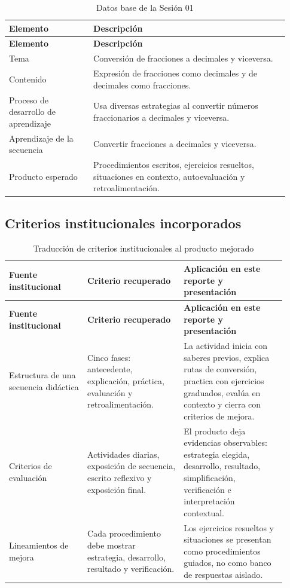 \documentclass[
	spanish,
	letterpaper, oneside
]{article}
\begin{document}
\begin{longtable}{@{}p{0.28\linewidth}p{0.65\linewidth}@{}}
	\caption{Datos base de la Sesión 01}\label{tab:datos-sesion}\\
	\toprule
	\textbf{Elemento} & \textbf{Descripción} \\
	\midrule
	\endfirsthead
	\toprule
	\textbf{Elemento} & \textbf{Descripción} \\
	\midrule
	\endhead
	Tema & Conversión de fracciones a decimales y viceversa. \\
	Contenido & Expresión de fracciones como decimales y de decimales como fracciones. \\
	Proceso de desarrollo de aprendizaje & Usa diversas estrategias al convertir números fraccionarios a decimales y viceversa. \\
	Aprendizaje de la secuencia & Convertir fracciones a decimales y viceversa. \\
	Producto esperado & Procedimientos escritos, ejercicios resueltos, situaciones en contexto, autoevaluación y retroalimentación. \\
	\bottomrule
\end{longtable}

\subsection{Criterios institucionales incorporados}

\begin{longtable}{@{}p{0.26\linewidth}p{0.32\linewidth}p{0.34\linewidth}@{}}
	\caption{Traducción de criterios institucionales al producto mejorado}\label{tab:criterios-institucionales-s01}\\
	\toprule
	\textbf{Fuente institucional} & \textbf{Criterio recuperado} & \textbf{Aplicación en este reporte y presentación} \\
	\midrule
	\endfirsthead
	\toprule
	\textbf{Fuente institucional} & \textbf{Criterio recuperado} & \textbf{Aplicación en este reporte y presentación} \\
	\midrule
	\endhead
	Estructura de una secuencia didáctica & Cinco fases: antecedente, explicación, práctica, evaluación y retroalimentación. & La actividad inicia con saberes previos, explica rutas de conversión, practica con ejercicios graduados, evalúa en contexto y cierra con criterios de mejora. \\
	Criterios de evaluación & Actividades diarias, exposición de secuencia, escrito reflexivo y exposición final. & El producto deja evidencias observables: estrategia elegida, desarrollo, resultado, simplificación, verificación e interpretación contextual. \\
	Lineamientos de mejora & Cada procedimiento debe mostrar estrategia, desarrollo, resultado y verificación. & Los ejercicios resueltos y situaciones se presentan como procedimientos guiados, no como banco de respuestas aislado. \\
	\bottomrule
\end{longtable}
\end{document}
